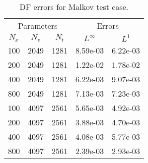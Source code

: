 \begin{table}[H]
	\centering
	\begin{tabular}{|ccc|cc|} \hline
	\multicolumn{3}{|c|}{Parameters} & \multicolumn{2}{c|}{Errors} \\ 
	\cline{1-5} $N_x$ & $N_v$ & $N_t$ & $L^{\infty}$ & $L^1$ \\ 
	\hline \hline 
	100 & 2049 & 1281 & 8.59e-03 & 6.22e-03 \\ \hline 
	200 & 2049 & 1281 & 1.22e-02 & 1.78e-02 \\ \hline 
	400 & 2049 & 1281 & 6.22e-03 & 9.07e-03 \\ \hline 
	800 & 2049 & 1281 & 7.13e-03 & 7.23e-03 \\ \hline \hline
	100 & 4097 & 2561 & 5.65e-03 & 4.92e-03 \\ \hline 
	200 & 4097 & 2561 & 3.88e-03 & 4.70e-03 \\ \hline 
	400 & 4097 & 2561 & 4.08e-03 & 5.77e-03 \\ \hline 
	800 & 4097 & 2561 & 2.39e-03 & 2.93e-03 \\ \hline 
	\end{tabular}
	\caption{DF errors for Malkov test case.}
	\label{tab:Malkov_DF}
\end{table}
